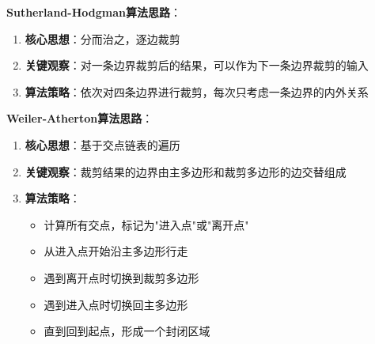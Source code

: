 \documentclass[12pt,a4paper]{article}
\begin{document}
\begin{tcolorbox}
\textbf{Sutherland-Hodgman算法思路}：
\begin{enumerate}
    \item \textbf{核心思想}：分而治之，逐边裁剪
    \item \textbf{关键观察}：对一条边界裁剪后的结果，可以作为下一条边界裁剪的输入
    \item \textbf{算法策略}：依次对四条边界进行裁剪，每次只考虑一条边界的内外关系
\end{enumerate}

\textbf{Weiler-Atherton算法思路}：
\begin{enumerate}
    \item \textbf{核心思想}：基于交点链表的遍历
    \item \textbf{关键观察}：裁剪结果的边界由主多边形和裁剪多边形的边交替组成
    \item \textbf{算法策略}：
    \begin{itemize}
        \item 计算所有交点，标记为"进入点"或"离开点"
        \item 从进入点开始沿主多边形行走
        \item 遇到离开点时切换到裁剪多边形
        \item 遇到进入点时切换回主多边形
        \item 直到回到起点，形成一个封闭区域
    \end{itemize}
\end{enumerate}

\end{tcolorbox}
\end{document}
